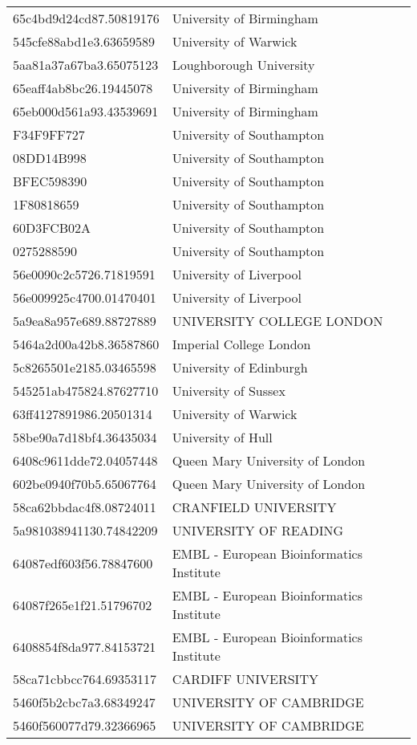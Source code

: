 \begin{tabular}{ll}
65c4bd9d24cd87.50819176 & University of Birmingham \\
545cfe88abd1e3.63659589 & University of Warwick \\
5aa81a37a67ba3.65075123 & Loughborough University \\
65eaff4ab8bc26.19445078 & University of Birmingham \\
65eb000d561a93.43539691 & University of Birmingham \\
F34F9FF727 & University of Southampton \\
08DD14B998 & University of Southampton \\
BFEC598390 & University of Southampton \\
1F80818659 & University of Southampton \\
60D3FCB02A & University of Southampton \\
0275288590 & University of Southampton \\
56e0090c2c5726.71819591 & University of Liverpool \\
56e009925c4700.01470401 & University of Liverpool \\
5a9ea8a957e689.88727889 & UNIVERSITY COLLEGE LONDON \\
5464a2d00a42b8.36587860 & Imperial College London \\
5c8265501e2185.03465598 & University of Edinburgh \\
545251ab475824.87627710 & University of Sussex \\
63ff4127891986.20501314 & University of Warwick \\
58be90a7d18bf4.36435034 & University of Hull \\
6408c9611dde72.04057448 & Queen Mary University of London \\
602be0940f70b5.65067764 & Queen Mary University of London \\
58ca62bbdac4f8.08724011 & CRANFIELD UNIVERSITY \\
5a981038941130.74842209 & UNIVERSITY OF READING \\
64087edf603f56.78847600 & EMBL - European Bioinformatics Institute \\
64087f265e1f21.51796702 & EMBL - European Bioinformatics Institute \\
6408854f8da977.84153721 & EMBL - European Bioinformatics Institute \\
58ca71cbbcc764.69353117 & CARDIFF UNIVERSITY \\
5460f5b2cbc7a3.68349247 & UNIVERSITY OF CAMBRIDGE \\
5460f560077d79.32366965 & UNIVERSITY OF CAMBRIDGE \\

\end{tabular}
